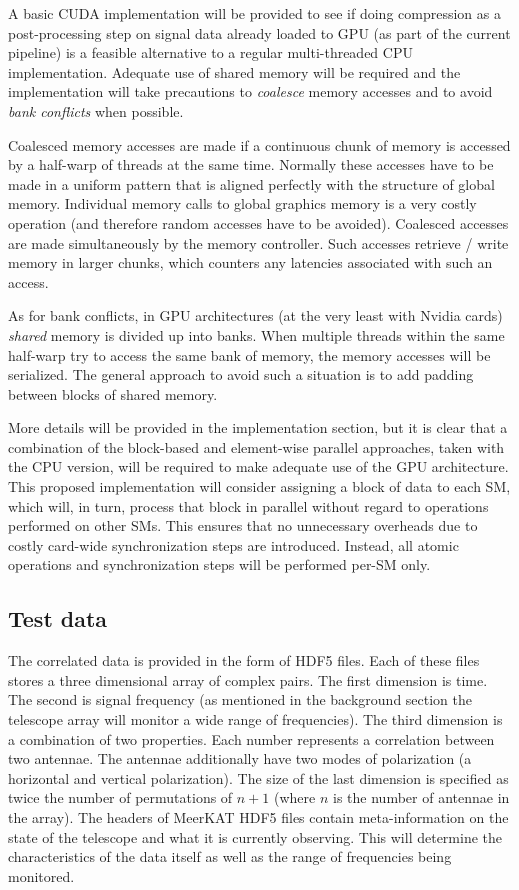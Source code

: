 A basic CUDA implementation will be provided to see if doing compression as a post-processing step on signal data already loaded to GPU (as part of the current pipeline) is a 
feasible alternative to a regular multi-threaded CPU implementation. Adequate use of shared memory will be required and the implementation will take precautions to \textit{coalesce} 
memory accesses and to avoid \textit{bank conflicts} when possible. 

Coalesced memory accesses are made if a continuous chunk of memory is accessed by a half-warp of threads at the same time. Normally these accesses have to be made in a uniform pattern that is aligned perfectly
with the structure of global memory. Individual memory calls to global graphics memory is a very costly operation (and therefore random accesses have to be avoided). Coalesced accesses are made simultaneously by 
the memory controller. Such accesses retrieve / write memory in larger chunks, which counters any latencies associated with such an access. 

As for bank conflicts, in GPU architectures (at the very least with Nvidia cards) \emph{shared} memory is divided up into banks. When multiple threads within the same half-warp try to 
access the same bank of memory, the memory accesses will be serialized. The general approach to avoid such a situation is to add padding between blocks of shared memory.

More details will be provided in the implementation section, but it is clear that a combination of the block-based and element-wise parallel approaches, taken with the CPU version, will be 
required to make adequate use of the GPU architecture. This proposed implementation will consider assigning a block of data to each SM, which will, in turn, process that block in parallel without 
regard to operations performed on other SMs. This ensures that no unnecessary overheads due to costly card-wide synchronization steps are introduced. Instead, all atomic 
operations and synchronization steps will be performed per-SM only.
\subsection{Test data}
The correlated data is provided in the form of HDF5 files. Each of these files stores a three dimensional array of complex pairs. The first dimension is time. The second 
is signal frequency (as mentioned in the background section the telescope array will monitor a wide range of frequencies). The third dimension is a combination of two 
properties. Each number represents a correlation between two antennae. The antennae additionally have two modes of polarization (a horizontal and vertical polarization). 
The size of the last dimension is specified as twice the number of permutations of $n + 1$ (where $n$ is the number of antennae in the array). The headers of 
MeerKAT HDF5 files contain meta-information on the state of the telescope and what it is currently observing. This will determine the 
characteristics of the data itself as well as the range of frequencies being monitored. 

